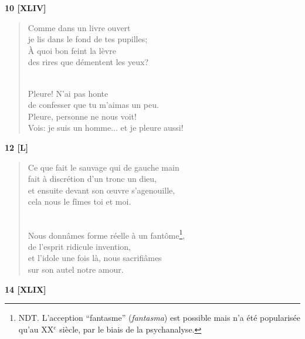 \documentclass[a4paper,12pt]{book}
\begin{document}
\begin{center} {\bf 10 [XLIV]}  \end{center}

\begin{verse}
Comme dans un livre ouvert \\
je lis dans le fond de tes pupilles; \\
À quoi bon feint la lèvre \\
des rires que démentent les yeux? \\ \

Pleure! N'ai pas honte \\
de confesser que tu m'aimas un peu. \\
Pleure, personne ne nous voit! \\
Vois: je suis un homme... et je pleure aussi! \\
\end{verse}

\bigskip

\begin{center} {\bf 12 [L]} \end{center}

\begin{verse}
Ce que fait le sauvage qui de gauche main \\
fait à discrétion d'un tronc un dieu, \\
et ensuite devant son {\oe}uvre s'agenouille, \\
cela nous le fîmes toi et moi. \\ \

Nous donnâmes forme réelle à un fantôme\footnote{NDT. L'acception ``fantasme'' ({\em fantasma}) est possible mais n'a été popularisée qu'au XX$^e$ siècle, par le biais de la psychanalyse.}, \\
de l'esprit ridicule invention, \\
et l'idole une fois là, nous sacrifiâmes \\
sur son autel notre amour. \\
\end{verse}


\begin{center} {\bf 14 [XLIX]} \end{center}
\end{document}
